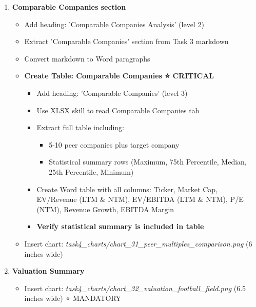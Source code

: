 \documentclass[11pt]{article}
\begin{document}
\begin{enumerate}[leftmargin=*,itemsep=2pt,topsep=2pt]
\begin{itemize}[leftmargin=*,itemsep=2pt,topsep=2pt]
\begin{itemize}[leftmargin=*,itemsep=2pt,topsep=2pt]
\end{itemize}
\item {} Insert chart: \emph{task4\_\allowbreak{}charts/chart\_\allowbreak{}29\_\allowbreak{}dcf\_\allowbreak{}waterfall.png} (6 inches wide)
\end{itemize}
\item {} \textbf{Comparable Companies section}
\begin{itemize}[leftmargin=*,itemsep=2pt,topsep=2pt]
\item {} Add heading: 'Comparable Companies Analysis' (level 2)
\item {} Extract 'Comparable Companies' section from Task 3 markdown
\item {} Convert markdown to Word paragraphs
\item {} \textbf{Create Table: Comparable Companies ⭐ CRITICAL}
\begin{itemize}[leftmargin=*,itemsep=2pt,topsep=2pt]
\item {} Add heading: 'Comparable Companies' (level 3)
\item {} Use XLSX skill to read Comparable Companies tab
\item {} Extract full table including:
\begin{itemize}[leftmargin=*,itemsep=2pt,topsep=2pt]
\item {} 5-10 peer companies plus target company
\item {} Statistical summary rows (Maximum, 75th Percentile, Median, 25th Percentile, Minimum)
\end{itemize}
\item {} Create Word table with all columns: Ticker, Market Cap, EV/Revenue (LTM \& NTM), EV/EBITDA (LTM \& NTM), P/E (NTM), Revenue Growth, EBITDA Margin
\item {} \textbf{Verify statistical summary is included in table}
\end{itemize}
\item {} Insert chart: \emph{task4\_\allowbreak{}charts/chart\_\allowbreak{}31\_\allowbreak{}peer\_\allowbreak{}multiples\_\allowbreak{}comparison.png} (6 inches wide)
\end{itemize}
\item {} \textbf{Valuation Summary}
\begin{itemize}[leftmargin=*,itemsep=2pt,topsep=2pt]
\item {} Insert chart: \emph{task4\_\allowbreak{}charts/chart\_\allowbreak{}32\_\allowbreak{}valuation\_\allowbreak{}football\_\allowbreak{}field.png} (6.5 inches wide) ⭐ MANDATORY

\end{itemize}
\end{enumerate}
\end{document}
